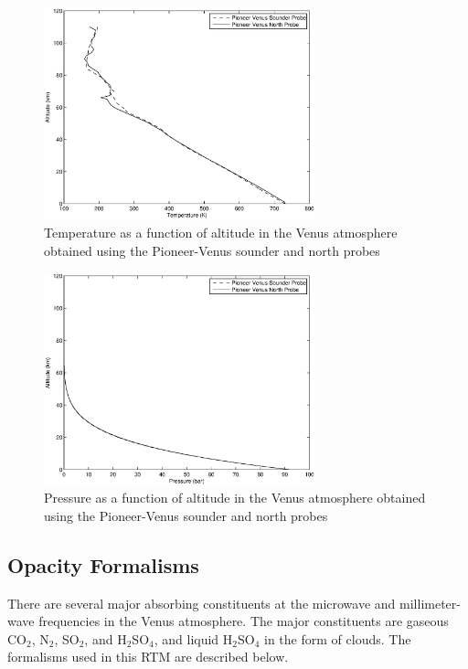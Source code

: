 \begin{figure}[p]
    \centering
	\includegraphics[width=0.7\textwidth]{./rtm/plots/alt-temp.eps}
	\caption{Temperature as a function of altitude in the Venus atmosphere obtained using the Pioneer-Venus sounder and north probes }
		\label{fig:temp}
\end{figure}
\begin{figure}[p]
    \centering
	\includegraphics[width=0.7\textwidth]{./rtm/plots/alt-pres.eps}
	\caption{Pressure as a function of altitude in the Venus atmosphere obtained using the Pioneer-Venus sounder and north probes }
		\label{fig:pres}
\end{figure}

\subsection{Opacity Formalisms}

There are several major absorbing constituents at the microwave and millimeter-wave frequencies in the Venus atmosphere. The major constituents are gaseous CO$_2$, N$_2$, SO$_2$, and H$_2$SO$_4$, and liquid H$_2$SO$_4$ in the form of clouds. The formalisms used in this RTM are described below.
